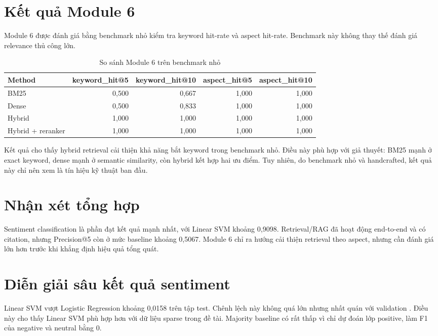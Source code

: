 \section{Kết quả Module 6}
Module 6 được đánh giá bằng benchmark nhỏ kiểm tra keyword hit-rate và aspect hit-rate. Benchmark này không thay thế đánh giá relevance thủ công lớn.
\begin{table}[H]\centering\caption{So sánh Module 6 trên benchmark nhỏ}\label{tab:module6-comparison}\begin{tabular}{lrrrr}\toprule Method & keyword\_hit@5 & keyword\_hit@10 & aspect\_hit@5 & aspect\_hit@10 \\\midrule BM25 & 0,500 & 0,667 & 1,000 & 1,000 \\ Dense & 0,500 & 0,833 & 1,000 & 1,000 \\ Hybrid & 1,000 & 1,000 & 1,000 & 1,000 \\ Hybrid + reranker & 1,000 & 1,000 & 1,000 & 1,000 \\\bottomrule\end{tabular}\end{table}

Kết quả cho thấy hybrid retrieval cải thiện khả năng bắt keyword trong benchmark nhỏ. Điều này phù hợp với giả thuyết: BM25 mạnh ở exact keyword, dense mạnh ở semantic similarity, còn hybrid kết hợp hai ưu điểm. Tuy nhiên, do benchmark nhỏ và handcrafted, kết quả này chỉ nên xem là tín hiệu kỹ thuật ban đầu.

\section{Nhận xét tổng hợp}
Sentiment classification là phần đạt kết quả mạnh nhất, với Linear SVM \MacroFOne{} khoảng 0,9098. Retrieval/RAG đã hoạt động end-to-end và có citation, nhưng Precision@5 còn ở mức baseline khoảng 0,5067. Module 6 chỉ ra hướng cải thiện retrieval theo aspect, nhưng cần đánh giá lớn hơn trước khi khẳng định hiệu quả tổng quát.

\section{Diễn giải sâu kết quả sentiment}
Linear SVM vượt Logistic Regression khoảng 0,0158 \MacroFOne{} trên tập test. Chênh lệch này không quá lớn nhưng nhất quán với validation \MacroFOne{}. Điều này cho thấy Linear SVM phù hợp hơn với dữ liệu \TFIDF{} sparse trong đề tài. Majority baseline có \MacroFOne{} rất thấp vì chỉ dự đoán lớp positive, làm F1 của negative và neutral bằng 0.

